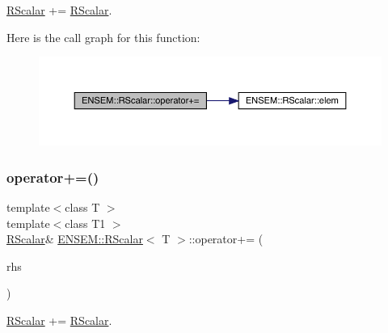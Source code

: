 \mbox{\hyperlink{classENSEM_1_1RScalar}{R\+Scalar}} += \mbox{\hyperlink{classENSEM_1_1RScalar}{R\+Scalar}}. 

Here is the call graph for this function\+:
\nopagebreak
\begin{figure}[H]
\begin{center}
\leavevmode
\includegraphics[width=350pt]{d0/d8c/classENSEM_1_1RScalar_adc6bf2610b8af0ab175ef00d9194aa1d_cgraph}
\end{center}
\end{figure}
\mbox{\label{classENSEM_1_1RScalar_adc6bf2610b8af0ab175ef00d9194aa1d}} 
\subsubsection{\texorpdfstring{operator+=()}{operator+=()}\hspace{0.1cm}{\footnotesize\ttfamily [2/2]}}
{\footnotesize\ttfamily template$<$class T $>$ \\
template$<$class T1 $>$ \\
\mbox{\hyperlink{classENSEM_1_1RScalar}{R\+Scalar}}\& \mbox{\hyperlink{classENSEM_1_1RScalar}{E\+N\+S\+E\+M\+::\+R\+Scalar}}$<$ T $>$\+::operator+= (\begin{DoxyParamCaption}\item[{const \mbox{\hyperlink{classENSEM_1_1RScalar}{R\+Scalar}}$<$ T1 $>$ \&}]{rhs }\end{DoxyParamCaption})\hspace{0.3cm}{\ttfamily [inline]}}



\mbox{\hyperlink{classENSEM_1_1RScalar}{R\+Scalar}} += \mbox{\hyperlink{classENSEM_1_1RScalar}{R\+Scalar}}. 

